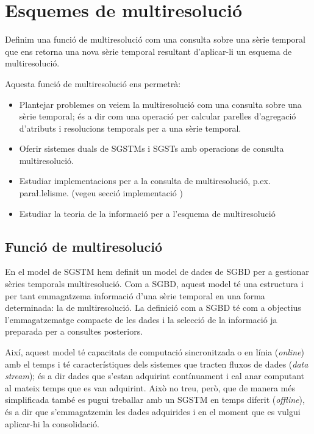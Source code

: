 
\chapter{Esquemes de multiresolució}

\todo{}


Definim una funció de multiresolució com una consulta sobre una sèrie
temporal que ens retorna una nova sèrie temporal resultant
d'aplicar-li un esquema de multiresolució. 

Aquesta funció de multiresolució ens permetrà:

\begin{itemize}
\item Plantejar problemes on veiem la multiresolució com una consulta
  sobre una sèrie temporal; és a dir com una operació per calcular
  parelles d'agregació d'atributs i resolucions temporals per a una
  sèrie temporal.
\item Oferir sistemes duals de \glspl{SGSTM} i \glspl{SGST} amb operacions
  de consulta multiresolució.
\item Estudiar implementacions per a la consulta de multiresolució, p.ex. para\l.lelisme. (vegeu secció implementació \todo{})
\item Estudiar la teoria de la informació per a l'esquema de multiresolució
\end{itemize}


\section{Funció de multiresolució}
\label{sec:multiresolucio:funcio}

En el model de \gls{SGSTM} hem definit un model de dades de \gls{SGBD}
per a gestionar sèries temporals multiresolució. Com a \gls{SGBD},
aquest model té una estructura i per tant emmagatzema informació d'una
sèrie temporal en una forma determinada: la de multiresolució.  La
definició com a \gls{SGBD} té com a objectius l'emmagatzematge
compacte de les dades i la selecció de la informació ja preparada per
a consultes posteriors. 

Així, aquest model té capacitats de computació
sincronitzada o en línia (\emph{online}) amb el temps i té
característiques dels sistemes que tracten fluxos de dades (\emph{data
  stream}); és a dir dades que s'estan adquirint contínuament i cal
anar computant al mateix temps que es van adquirint. Això no treu,
però, que de manera més simplificada també es pugui treballar amb un
\gls{SGSTM} en temps diferit (\emph{offline}), és a dir que
s'emmagatzemin les dades adquirides i en el moment que es vulgui
aplicar-hi la consolidació.




